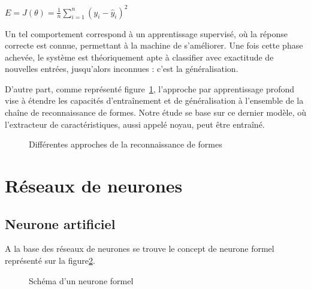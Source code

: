       \begin{center} $ E = J({\theta}) =  \frac{1}{n}\sum\limits_{i=1}^{n} (y_{i} - \hat{y}_{i})^2 $ \end{center}

      Un tel comportement correspond à un apprentissage supervisé, où la réponse correcte est connue, permettant à la machine de s'améliorer. Une fois cette phase achevée, le système est théoriquement apte à
      classifier avec exactitude de nouvelles entrées, jusqu'alors inconnues : c'est la généralisation.
      \par
      D'autre part, comme représenté figure~\ref{fig:c1p1s2}, l'approche par apprentissage profond vise à étendre les capacités d'entraînement et de généralisation à l'ensemble de la chaîne de reconnaissance de formes.
      Notre étude se base sur ce dernier modèle, où l'extracteur de caractéristiques, aussi appelé noyau, peut être entraîné.

      \begin{figure}[H]
	  \centering
	  \makebox[\textwidth]{}
	  \caption{Différentes approches de la reconnaissance de formes}
	  \label{fig:c1p1s2}
      \end{figure}

  \section{Réseaux de neurones}

    \subsection{Neurone artificiel}

      A la base des réseaux de neurones se trouve le concept de neurone formel représenté sur la figure\ref{fig:c1p2s1}.
      \par
      \begin{figure}[H]
	  \centering
	  \makebox[\textwidth]{}
	  \caption{Schéma d'un neurone formel}
	  \label{fig:c1p2s1}
      \end{figure}

